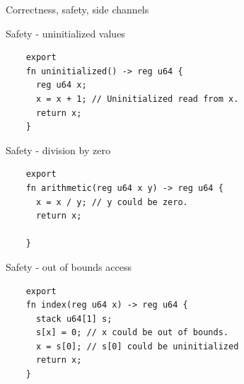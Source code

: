 \begin{frame}{Correctness, safety, side channels}
  \begin{minipage}[t]{0.45\linewidth}
  \end{minipage}\hfill%
  \begin{minipage}[t]{0.45\linewidth}
  \end{minipage}
\end{frame}


\begin{frame}[fragile]{Safety - uninitialized values}
  \lstset{
    language=Jasmin,
    basicstyle=\footnotesize\ttfamily,
    escapechar=~~,
  }
  \begin{lstlisting}
    export
    fn uninitialized() -> reg u64 {
      reg u64 x;
      x = x + 1; // Uninitialized read from x.
      return x;
    }
  \end{lstlisting}
\end{frame}

\begin{frame}[fragile]{Safety - division by zero}
  \lstset{
    language=Jasmin,
    basicstyle=\footnotesize\ttfamily,
    escapechar=~~,
  }
  \begin{lstlisting}
    export
    fn arithmetic(reg u64 x y) -> reg u64 {
      x = x / y; // y could be zero.
      return x;

    }
  \end{lstlisting}
\end{frame}


\begin{frame}[fragile]{Safety - out of bounds access}
  \lstset{
    language=Jasmin,
    basicstyle=\footnotesize\ttfamily,
    escapechar=~~
  }
  \begin{lstlisting}
    export
    fn index(reg u64 x) -> reg u64 {
      stack u64[1] s;
      s[x] = 0; // x could be out of bounds.
      x = s[0]; // s[0] could be uninitialized
      return x;
    }
  \end{lstlisting}
\end{frame}

